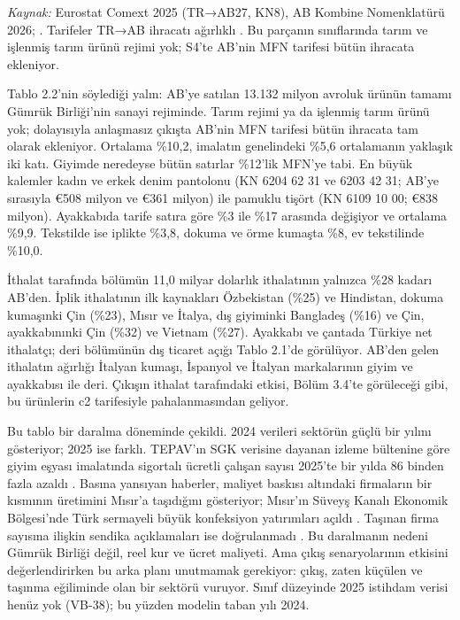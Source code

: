 \endgroup

\emph{Kaynak:} Eurostat Comext 2025 (TR→AB27, KN8), AB Kombine Nomenklatürü 2026; . Tarifeler TR→AB ihracatı ağırlıklı \etiketT{}. Bu parçanın sınıflarında tarım ve işlenmiş tarım ürünü rejimi yok; S4'te AB'nin MFN tarifesi bütün ihracata ekleniyor.

Tablo 2.2'nin söylediği yalın: AB'ye satılan 13.132 milyon avroluk ürünün tamamı Gümrük Birliği'nin sanayi rejiminde. Tarım rejimi ya da işlenmiş tarım ürünü yok; dolayısıyla anlaşmasız çıkışta AB'nin MFN tarifesi bütün ihracata tam olarak ekleniyor. Ortalama \%10,2, imalatın genelindeki \%5,6 ortalamanın yaklaşık iki katı. Giyimde neredeyse bütün satırlar \%12'lik MFN'ye tabi. En büyük kalemler kadın ve erkek denim pantolonu (KN 6204 62 31 ve 6203 42 31; AB'ye sırasıyla €508 milyon ve €361 milyon) ile pamuklu tişört (KN 6109 10 00; €838 milyon). Ayakkabıda tarife satıra göre \%3 ile \%17 arasında değişiyor ve ortalama \%9,9. Tekstilde ise iplikte \%3,8, dokuma ve örme kumaşta \%8, ev tekstilinde \%10,0.

İthalat tarafında bölümün 11,0 milyar dolarlık ithalatının yalnızca \%28 kadarı AB'den. İplik ithalatının ilk kaynakları Özbekistan (\%25) ve Hindistan, dokuma kumaşınki Çin (\%23), Mısır ve İtalya, dış giyiminki Bangladeş (\%16) ve Çin, ayakkabınınki Çin (\%32) ve Vietnam (\%27). Ayakkabı ve çantada Türkiye net ithalatçı; deri bölümünün dış ticaret açığı Tablo 2.1'de görülüyor. AB'den gelen ithalatın ağırlığı İtalyan kumaşı, İspanyol ve İtalyan markalarının giyim ve ayakkabısı ile deri. Çıkışın ithalat tarafındaki etkisi, Bölüm 3.4'te görüleceği gibi, bu ürünlerin c2 tarifesiyle pahalanmasından geliyor.

Bu tablo bir daralma döneminde çekildi. 2024 verileri sektörün güçlü bir yılını gösteriyor; 2025 ise farklı. TEPAV'ın SGK verisine dayanan izleme bültenine göre giyim eşyası imalatında sigortalı ücretli çalışan sayısı 2025'te bir yılda 86 binden fazla azaldı \etiketV{}. Basına yansıyan haberler, maliyet baskısı altındaki firmaların bir kısmının üretimini Mısır'a taşıdığını gösteriyor; Mısır'ın Süveyş Kanalı Ekonomik Bölgesi'nde Türk sermayeli büyük konfeksiyon yatırımları açıldı \etiketV{}. Taşınan firma sayısına ilişkin sendika açıklamaları ise doğrulanmadı \etiketD{}. Bu daralmanın nedeni Gümrük Birliği değil, reel kur ve ücret maliyeti. Ama çıkış senaryolarının etkisini değerlendirirken bu arka planı unutmamak gerekiyor: çıkış, zaten küçülen ve taşınma eğiliminde olan bir sektörü vuruyor. Sınıf düzeyinde 2025 istihdam verisi henüz yok (VB-38); bu yüzden modelin taban yılı 2024.

